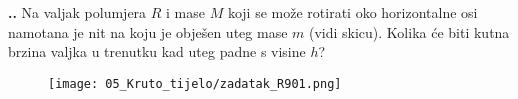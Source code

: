 

\noindent 
\textbf{
\thecjelina.\thezadatak.}
Na valjak polumjera $R$ i mase $M$ koji se može rotirati oko horizontalne osi namotana je nit na koju je obje\v{s}en uteg mase
$m$ (vidi skicu). Kolika će biti kutna brzina valjka u trenutku kad uteg padne s visine $h$?
\begin{figure}[h]%
  \begin{center}
    \texttt{[image: 05\_Kruto\_tijelo/zadatak\_R901.png]}
  \end{center}
\end{figure}



